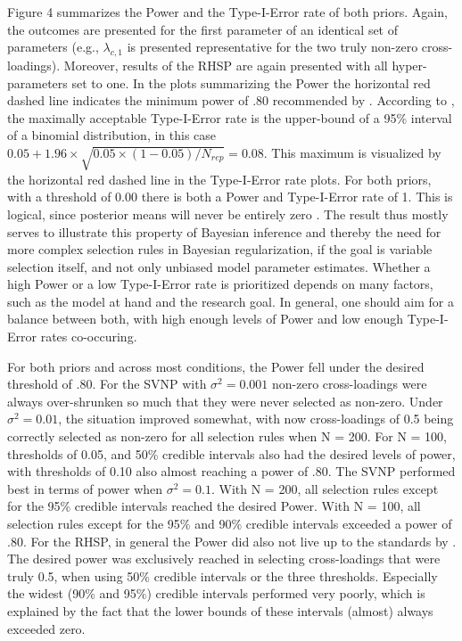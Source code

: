 \documentclass[]{interact}
\theoremstyle{plain}%
\theoremstyle{definition}
\theoremstyle{remark}
\begin{document}
Figure 4 summarizes the Power and the Type-I-Error rate of both priors.
Again, the outcomes are presented for the first parameter of an
identical set of parameters (e.g., \(\lambda_{c,1}\) is presented
representative for the two truly non-zero cross-loadings). Moreover,
results of the RHSP are again presented with all hyper-parameters set to
one. In the plots summarizing the Power the horizontal red dashed line
indicates the minimum power of .80 recommended by
\citet{muthen_bayesian_2012}. According to \citet{cham_estimating_2012},
the maximally acceptable Type-I-Error rate is the upper-bound of a 95\%
interval of a binomial distribution, in this case
\(0.05 + 1.96 \times \sqrt{0.05 \times (1-0.05)/ N_{rep}} = 0.08\). This
maximum is visualized by the horizontal red dashed line in the
Type-I-Error rate plots. For both priors, with a threshold of 0.00 there
is both a Power and Type-I-Error rate of 1. This is logical, since
posterior means will never be entirely zero \citep{zhang_criteria_2021}.
The result thus mostly serves to illustrate this property of Bayesian
inference and thereby the need for more complex selection rules in
Bayesian regularization, if the goal is variable selection itself, and
not only unbiased model parameter estimates. Whether a high Power or a
low Type-I-Error rate is prioritized depends on many factors, such as
the model at hand and the research goal. In general, one should aim for
a balance between both, with high enough levels of Power and low enough
Type-I-Error rates co-occuring.

For both priors and across most conditions, the Power fell under the
desired threshold of .80. For the SVNP with \(\sigma^2 = 0.001\)
non-zero cross-loadings were always over-shrunken so much that they were
never selected as non-zero. Under \(\sigma^2 = 0.01\), the situation
improved somewhat, with now cross-loadings of 0.5 being correctly
selected as non-zero for all selection rules when N = 200. For N = 100,
thresholds of 0.05, and 50\% credible intervals also had the desired
levels of power, with thresholds of 0.10 also almost reaching a power of
.80. The SVNP performed best in terms of power when \(\sigma^2 = 0.1\).
With N = 200, all selection rules except for the 95\% credible intervals
reached the desired Power. With N = 100, all selection rules except for
the 95\% and 90\% credible intervals exceeded a power of .80. For the
RHSP, in general the Power did also not live up to the standards by
\citet{muthen_bayesian_2012}. The desired power was exclusively reached
in selecting cross-loadings that were truly 0.5, when using 50\%
credible intervals or the three thresholds. Especially the widest (90\%
and 95\%) credible intervals performed very poorly, which is explained
by the fact that the lower bounds of these intervals (almost) always
exceeded zero.
\end{document}
